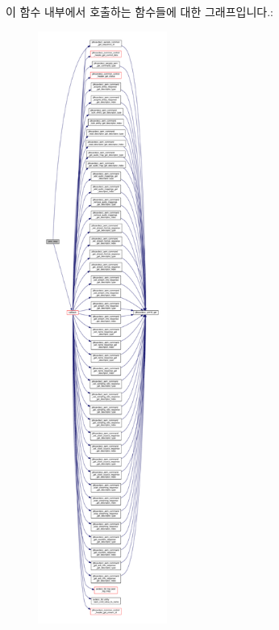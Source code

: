 이 함수 내부에서 호출하는 함수들에 대한 그래프입니다.\+:
\nopagebreak
\begin{figure}[H]
\begin{center}
\leavevmode
\includegraphics[height=550pt]{classavdecc__lib_1_1aecp__controller__state__machine_a81d345252361d6b1650316379916ccf6_cgraph}
\end{center}
\end{figure}




